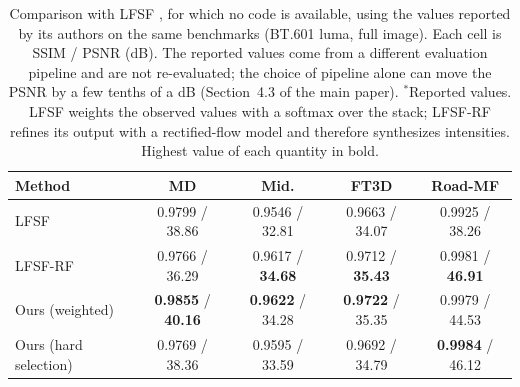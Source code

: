 \begin{table}[htbp]
\centering
\footnotesize
\setlength{\tabcolsep}{3pt}
\caption{Comparison with LFSF \cite{li2026lfsf}, for which no code is available, using the values reported by its authors on the same benchmarks (BT.601 luma, full image). Each cell is SSIM / PSNR (dB). The reported values come from a different evaluation pipeline and are not re-evaluated; the choice of pipeline alone can move the PSNR by a few tenths of a dB (Section~4.3 of the main paper). $^{\ast}$Reported values. LFSF weights the observed values with a softmax over the stack; LFSF-RF refines its output with a rectified-flow model and therefore synthesizes intensities. Highest value of each quantity in bold.}
\label{tab:lfsf}
\begin{tabular}{lcccc}
\toprule
Method & MD & Mid. & FT3D & Road-MF \\
\midrule
LFSF & 0.9799 / 38.86 & 0.9546 / 32.81 & 0.9663 / 34.07 & 0.9925 / 38.26 \\
LFSF-RF & 0.9766 / 36.29 & 0.9617 / \textbf{34.68} & 0.9712 / \textbf{35.43} & 0.9981 / \textbf{46.91} \\
Ours (weighted) & \textbf{0.9855} / \textbf{40.16} & \textbf{0.9622} / 34.28 & \textbf{0.9722} / 35.35 & 0.9979 / 44.53 \\
Ours (hard selection) & 0.9769 / 38.36 & 0.9595 / 33.59 & 0.9692 / 34.79 & \textbf{0.9984} / 46.12 \\
\bottomrule
\end{tabular}
\end{table}
